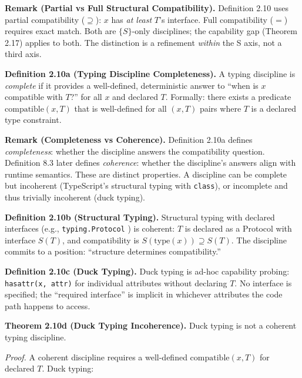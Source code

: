 \textbf{Remark (Partial vs Full Structural Compatibility).} Definition
2.10 uses partial compatibility (\(\supseteq\)): \(x\) has \emph{at
least} \(T\)'s interface. Full compatibility (\(=\)) requires exact
match. Both are \(\{S\}\)-only disciplines; the capability gap (Theorem
2.17) applies to both. The distinction is a refinement \emph{within} the
S axis, not a third axis.

\textbf{Definition 2.10a (Typing Discipline Completeness).} A typing
discipline is \emph{complete} if it provides a well-defined,
deterministic answer to ``when is \(x\) compatible with \(T\)?'' for all
\(x\) and declared \(T\). Formally: there exists a predicate
\(\text{compatible}(x, T)\) that is well-defined for all \((x, T)\)
pairs where \(T\) is a declared type constraint.

\textbf{Remark (Completeness vs Coherence).} Definition 2.10a defines
\emph{completeness}: whether the discipline answers the compatibility
question. Definition 8.3 later defines \emph{coherence}: whether the
discipline's answers align with runtime semantics. These are distinct
properties. A discipline can be complete but incoherent (TypeScript's
structural typing with \texttt{class}), or incomplete and thus trivially
incoherent (duck typing).

\textbf{Definition 2.10b (Structural Typing).} Structural typing with
declared interfaces (e.g., \texttt{typing.Protocol}
\cite{pep544,pep484}) is coherent: \(T\) is declared as a Protocol with
interface \(S(T)\), and compatibility is
\(S(\text{type}(x)) \supseteq S(T)\). The discipline commits to a
position: ``structure determines compatibility.''

\textbf{Definition 2.10c (Duck Typing).} Duck typing is ad-hoc
capability probing: \texttt{hasattr(x,\ attr)}
\cite{pythonBuiltinsHasattr} for individual attributes without
declaring \(T\). No interface is specified; the ``required interface''
is implicit in whichever attributes the code path happens to access.

\textbf{Theorem 2.10d (Duck Typing Incoherence).} Duck typing is not a
coherent typing discipline.

\emph{Proof.} A coherent discipline requires a well-defined
\(\text{compatible}(x, T)\) for declared \(T\). Duck typing:

